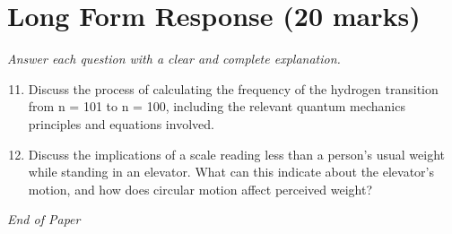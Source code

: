 \documentclass[12pt]{article}
\begin{document}
\section*{Long Form Response (20 marks)}
\textit{Answer each question with a clear and complete explanation.}
\begin{enumerate}[label=\arabic*.]
\setcounter{enumi}{10}
\item Discuss the process of calculating the frequency of the hydrogen transition from n = 101
to n = 100, including the relevant quantum mechanics principles and equations involved.
\item Discuss the implications of a scale reading less than a person's usual weight while
standing in an elevator. What can this indicate about the elevator's motion, and how does
circular motion affect perceived weight?
\end{enumerate}

\vfill
\noindent\textit{End of Paper}
\end{document}
